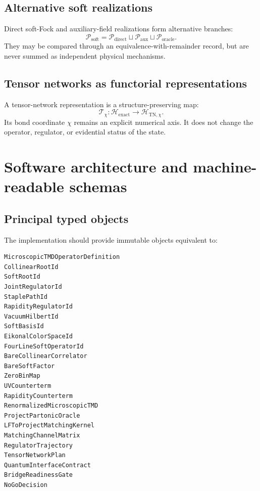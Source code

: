 \documentclass[11pt]{article}
\newcommand{\cT}{\mathcal T}
\newcommand{\cH}{\mathcal H}
\newcommand{\cP}{\mathcal P}
\newcommand{\Soft}{\ensuremath{\mathrm{soft}}}
\begin{document}
\subsection{Alternative soft realizations}

Direct soft-Fock and auxiliary-field realizations form alternative branches:
\begin{equation}
 \cP_{\Soft}
 =
 \cP_{\mathrm{direct}}
 \sqcup
 \cP_{\mathrm{aux}}
 \sqcup
 \cP_{\mathrm{oracle}}.
 \label{eq:soft-plans}
\end{equation}
They may be compared through an equivalence-with-remainder record, but are never summed as independent physical mechanisms.

\subsection{Tensor networks as functorial representations}

A tensor-network representation is a structure-preserving map:
\begin{equation}
 \cT_{\chi}:
 \cH_{\mathrm{exact}}
 \longrightarrow
 \cH_{\mathrm{TN},\chi}.
 \label{eq:tn-functor}
\end{equation}
Its bond coordinate \(\chi\) remains an explicit numerical axis.  It does not change the operator, regulator, or evidential status of the state.

\section{Software architecture and machine-readable schemas}
\label{sec:software}

\subsection{Principal typed objects}

The implementation should provide immutable objects equivalent to:
\begin{verbatim}
MicroscopicTMDOperatorDefinition
CollinearRootId
SoftRootId
JointRegulatorId
StaplePathId
RapidityRegulatorId
VacuumHilbertId
SoftBasisId
EikonalColorSpaceId
FourLineSoftOperatorId
BareCollinearCorrelator
BareSoftFactor
ZeroBinMap
UVCounterterm
RapidityCounterterm
RenormalizedMicroscopicTMD
ProjectPartonicOracle
LFToProjectMatchingKernel
MatchingChannelMatrix
RegulatorTrajectory
TensorNetworkPlan
QuantumInterfaceContract
BridgeReadinessGate
NoGoDecision
\end{verbatim}
\end{document}
